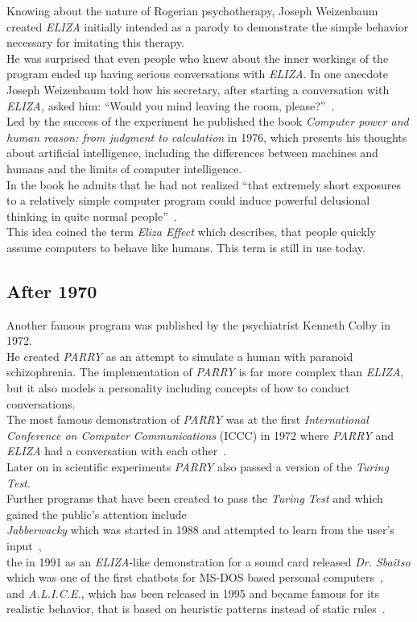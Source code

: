 Knowing about the nature of Rogerian psychotherapy, Joseph Weizenbaum created \emph{ELIZA} initially intended as a parody to demonstrate the simple behavior necessary for imitating this therapy.
\\
He was surprised that even people who knew about the inner workings of the program ended up having serious conversations with \emph{ELIZA}.
In one anecdote Joseph Weizenbaum told how his secretary, after starting a conversation with \emph{ELIZA,} asked him: ``Would you mind leaving the room, please?''~\cite[5]{weizenbaum}.
\\

Led by the success of the experiment he published the book \emph{Computer power and human reason: from judgment to calculation} in 1976,
which presents his thoughts about artificial intelligence,
including the differences between machines and humans and the limits of computer intelligence.
\\
In the book he admits that he had not realized ``that extremely short exposures to a relatively simple computer program could induce powerful delusional thinking in quite normal people''~\cite{bbcnowthen}.
\\
This idea coined the term \emph{Eliza Effect} which describes, that people quickly assume computers to behave like humans.
This term is still in use today.


\subsection{After 1970}

Another famous program was published by the psychiatrist Kenneth Colby in 1972.
\\
He created \emph{PARRY} as an attempt to simulate a human with paranoid schizophrenia.
The implementation of \emph{PARRY} is far more complex than \emph{ELIZA},
but it also models a personality including concepts of how to conduct conversations.
\\
The most famous demonstration of \emph{PARRY} was at the first \emph{International Conference on Computer Communications} (ICCC) in 1972 where \emph{PARRY} and \emph{ELIZA} had a conversation with each other~\cite{internethistory}.
\\
Later on in scientific experiments \emph{PARRY} also passed a version of the \emph{Turing Test}.
\\

Further programs that have been created to pass the \emph{Turing Test} and which gained the public's attention include
\\
\emph{Jabberwacky} which was started in 1988 and attempted to learn from the user's input~\cite{jabberwacky},
\\
the in 1991 as an \emph{ELIZA}-like demonstration for a sound card released \emph{Dr. Sbaitso} which was one of the first chatbots for MS-DOS based personal computers~\cite{pcmag},
\\
and \emph{A.L.I.C.E.}, which has been released in 1995 and became famous for its realistic behavior, that is based on heuristic patterns instead of static rules~\cite{approximatinglife}.
\\


